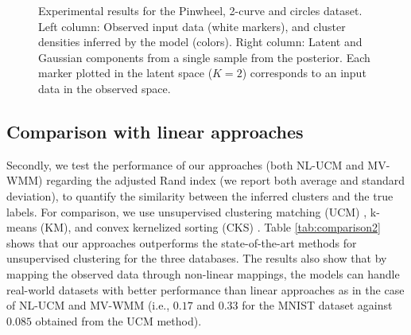\documentclass[]{article}
\begin{document}
\begin{figure}[ht!]
	\caption{Experimental results for the Pinwheel, 2-curve and circles dataset. Left column: Observed input data (white markers), and cluster densities inferred by the model (colors). Right column: Latent and Gaussian components from a single sample from the posterior. Each marker plotted in the latent space ($K = 2$) corresponds to an input data in the observed space. }
	\label{fig:MLsynthMVWMM}
\end{figure}


\subsection{Comparison with linear approaches}

Secondly, we test the performance of our approaches (both NL-UCM and MV-WMM) regarding the adjusted Rand index (we report both average and standard deviation), to quantify the similarity between the inferred clusters \cite{Iwata16} and the true labels. For comparison, we use unsupervised clustering matching (UCM) \cite{Iwata16}, k-means (KM), and convex kernelized sorting (CKS) \cite{Djuric12}. Table \ref{tab:comparison2} shows that our approaches outperforms the state-of-the-art methods for unsupervised clustering for the three databases. The results also show that by mapping the observed data through  non-linear mappings, the models can handle real-world datasets with better performance than linear approaches as in the case of NL-UCM and MV-WMM (i.e., $0.17$ and $0.33$ for the MNIST dataset against $0.085$ obtained from the UCM method). 
\end{document}
